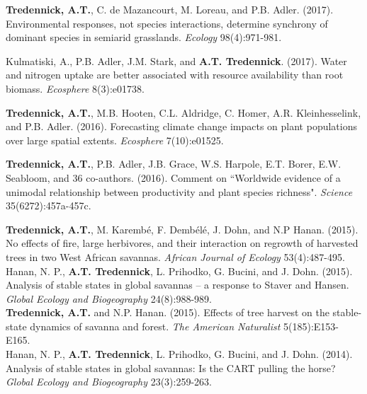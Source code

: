 \documentclass[margin,line]{resume}
\begin{document}
\begin{resume}
      \textbf{Tredennick, A.T.}, C. de Mazancourt, M. Loreau, and P.B. Adler. (2017). Environmental responses, not species interactions, determine synchrony of dominant species in semiarid grasslands. \emph{Ecology} 98(4):971-981.
      
      Kulmatiski, A., P.B. Adler, J.M. Stark, and \textbf{A.T. Tredennick}. (2017). Water and nitrogen uptake are better associated with resource availability than root biomass. \emph{Ecosphere} 8(3):e01738.
	
	  \textbf{Tredennick, A.T.}, M.B. Hooten, C.L. Aldridge, C. Homer, A.R. Kleinhesselink, and P.B. Adler. (2016). Forecasting climate change impacts on plant populations over large spatial extents. \emph{Ecosphere} 7(10):e01525.
	
	\textbf{Tredennick, A.T.}, P.B. Adler, J.B. Grace, W.S. Harpole, E.T. Borer, E.W. Seabloom, and 36 co-authors. (2016). Comment on ``Worldwide evidence of a unimodal relationship between productivity and plant species richness". \textsl{Science} 35(6272):457a-457c. \vspace{-6mm}\\%
	
				\newpage{}
	
	\textbf{Tredennick, A.T.}, M. Karemb\'{e}, F. Demb\'{e}l\'{e}, J. Dohn, and N.P Hanan. (2015). No effects of fire, large herbivores, and their interaction on regrowth of harvested trees in two West African savannas. \textsl{African Journal of Ecology} 53(4):487-495. \vspace{-6mm}\\%
	
	Hanan, N. P., \textbf{A.T. Tredennick}, L. Prihodko, G. Bucini, and J. Dohn. (2015). Analysis of stable states in global savannas -- a response to Staver and Hansen. 	\textsl{Global Ecology and Biogeography} 24(8):988-989. \vspace{-6mm}\\%
   
     	\textbf{Tredennick, A.T.} and N.P. Hanan. (2015). Effects of tree harvest on the stable-state dynamics of savanna and forest. \textsl{The American Naturalist} 5(185):E153-E165. \vspace{-6mm} \\%
	
	Hanan, N. P., \textbf{A.T. Tredennick}, L. Prihodko, G. Bucini, and J. Dohn. (2014). Analysis of stable states in global savannas: Is the CART pulling the horse? 	\textsl{Global Ecology and Biogeography} 23(3):259-263. \vspace{-6mm}\\%
	

\end{resume}
\end{document}
